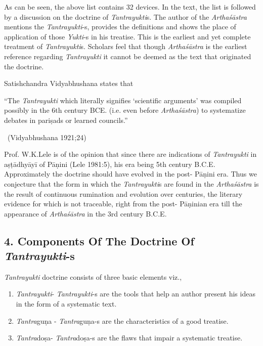 As can be seen, the above list contains 32 devices. In the text, the list is followed by a discussion on the doctrine of \textit{Tantrayukti}s. The author of the \textit{Arthaśāstra} mentions the \textit{Tantrayukti}-s, provides the definitions and shows the place of application of those \textit{Yukti}-s in his treatise. This is the earliest and yet complete treatment of \textit{Tantrayukti}s. Scholars feel that though \textit{Arthaśāstra} is the earliest reference regarding \textit{Tantrayukti} it cannot be deemed as the text that originated the doctrine.

Satishchandra Vidyabhushana states that

“The \textit{Tantrayukti} which literally signifies ‘scientific arguments’ was compiled possibly in the 6th century BCE. (i.e. even before \textit{Arthaśāstra}) to systematize debates in pariṣads or learned councils.”

~\hfill (Vidyabhushana 1921;24)

Prof. W.K.Lele is of the opinion that since there are indications of \textit{Tantrayukti} in aṣṭādhyāyī of Pāṇini (Lele 1981:5), his era being 5th century B.C.E. Approximately the doctrine should have evolved in the post- Pāṇini era. Thus we conjecture that the form in which the \textit{Tantrayukti}s are found in the \textit{Arthaśāstra} is the result of continuous rumination and evolution over centuries, the literary evidence for which is not traceable, right from the post- Pāṇinian era till the appearance of \textit{Arthaśāstra} in the 3rd century B.C.E.


\subsection*{4. Components Of The Doctrine Of \textit{Tantrayukti}-s}

\textit{Tantrayukti} doctrine consists of three basic elements viz.,

\begin{enumerate}[{\rm a.}]
\itemsep=0pt
\item \textit{Tantrayukti}- \textit{Tantrayukti}-s are the tools that help an author present his ideas in the form of a systematic text.

 \item \textit{Tantra}guṇa - \textit{Tantra}guṇa-s are the characteristics of a good treatise.

 \item \textit{Tantra}doṣa- \textit{Tantra}doṣa-s are the flaws that impair a systematic treatise.

\end{enumerate}

